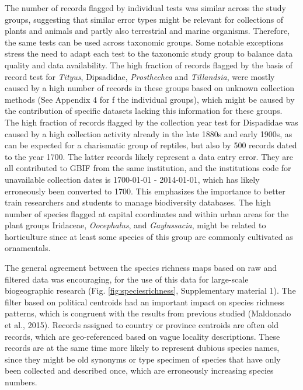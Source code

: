 \documentclass[
  12pt,
]{article}
\begin{document}
The number of records flagged by individual tests was similar across the study groups, suggesting that similar error types might be relevant for collections of plants and animals and partly also terrestrial and marine organisms. Therefore, the same tests can be used across taxonomic groups. Some notable exceptions stress the need to adapt each test to the taxonomic study group to balance data quality and data availability. The high fraction of records flagged by the basis of record test for \emph{Tityus}, Dipsadidae, \emph{Prosthechea} and \emph{Tillandsia}, were mostly caused by a high number of records in these groups based on unknown collection methods (See Appendix 4 for f the individual groups), which might be caused by the contribution of specific datasets lacking this information for these groups. The high fraction of records flagged by the collection year test for Dispadidae was caused by a high collection activity already in the late 1880s and early 1900s, as can be expected for a charismatic group of reptiles, but also by 500 records dated to the year 1700. The latter records likely represent a data entry error. They are all contributed to GBIF from the same institution, and the institutions code for unavailable collection dates is 1700-01-01 - 2014-01-01, which has likely erroneously been converted to 1700. This emphasizes the importance to better train researchers and students to manage biodiversity databases. The high number of species flagged at capital coordinates and within urban areas for the plant groups Iridaceae, \emph{Oocephalus}, and \emph{Gaylussacia}, might be related to horticulture since at least some species of this group are commonly cultivated as ornamentals.

The general agreement between the species richness maps based on raw and filtered data was encouraging, for the use of this data for large-scale biogeographic research (Fig. \ref{fig:speciesrichness}, Supplementary material 1). The filter based on political centroids had an important impact on species richness patterns, which is congruent with the results from previous studied (Maldonado et al., 2015). Records assigned to country or province centroids are often old records, which are geo-referenced based on vague locality descriptions. These records are at the same time more likely to represent dubious species names, since they might be old synonyms or type specimen of species that have only been collected and described once, which are erroneously increasing species numbers.
\end{document}
